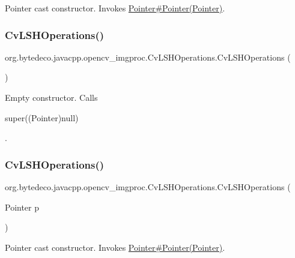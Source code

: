 Pointer cast constructor. Invokes \hyperlink{}{Pointer\#\+Pointer(\+Pointer)}. \mbox{\label{group__imgproc_gaabec493f329bf6b4f40358564e943ed6}} 
\subsubsection{\texorpdfstring{Cv\+L\+S\+H\+Operations()}{CvLSHOperations()}\hspace{0.1cm}{\footnotesize\ttfamily [1/2]}}
{\footnotesize\ttfamily org.\+bytedeco.\+javacpp.\+opencv\+\_\+imgproc.\+Cv\+L\+S\+H\+Operations.\+Cv\+L\+S\+H\+Operations (\begin{DoxyParamCaption}{ }\end{DoxyParamCaption})\hspace{0.3cm}{\ttfamily [inline]}}

Empty constructor. Calls
\begin{DoxyCode}
super((Pointer)null) 
\end{DoxyCode}
 . \mbox{\label{group__imgproc_ga71648279df2a0c93cb7616055661e4e8}} 
\subsubsection{\texorpdfstring{Cv\+L\+S\+H\+Operations()}{CvLSHOperations()}\hspace{0.1cm}{\footnotesize\ttfamily [2/2]}}
{\footnotesize\ttfamily org.\+bytedeco.\+javacpp.\+opencv\+\_\+imgproc.\+Cv\+L\+S\+H\+Operations.\+Cv\+L\+S\+H\+Operations (\begin{DoxyParamCaption}\item[{Pointer}]{p }\end{DoxyParamCaption})\hspace{0.3cm}{\ttfamily [inline]}}

Pointer cast constructor. Invokes \hyperlink{}{Pointer\#\+Pointer(\+Pointer)}. \mbox{\label{group__imgproc_ga7a9cbb0d2d4af395eb854396d5640ddb}} 
